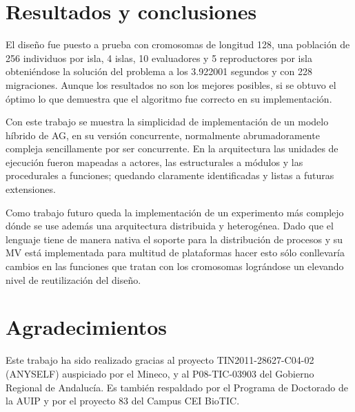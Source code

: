 \documentclass[runningheads]{llncs}
\begin{document}
\section{Resultados y conclusiones}
\label{sec:conclusions}

El diseño fue puesto a prueba con cromosomas de longitud 128, una población de 256 individuos por isla, 4 islas, 10 evaluadores y 5 reproductores por isla obteniéndose la solución del problema a los 3.922001 segundos y con 228 migraciones. Aunque los resultados no son los mejores posibles, si se obtuvo el óptimo lo que demuestra que el algoritmo fue correcto en su implementación.

Con este trabajo se muestra la simplicidad de implementación de un modelo híbrido de AG, en su versión concurrente, normalmente abrumadoramente compleja sencillamente por ser concurrente. En la arquitectura las unidades de ejecución fueron mapeadas a actores, las estructurales a módulos y las procedurales a funciones; quedando claramente identificadas y listas a futuras extensiones.

Como trabajo futuro queda la implementación de un experimento más complejo dónde se use además una arquitectura distribuida y heterogénea. Dado que el lenguaje tiene de manera nativa el soporte para la distribución de procesos y su MV está implementada para multitud de plataformas hacer esto sólo conllevaría cambios en las funciones que tratan con los cromosomas lográndose un elevando nivel de reutilización del diseño.

\section{Agradecimientos}

Este trabajo ha sido realizado gracias al proyecto TIN2011-28627-C04-02 (ANYSELF) auspiciado por el Mineco, y al P08-TIC-03903 del Gobierno Regional de Andalucía. Es también respaldado por el Programa de Doctorado de la AUIP y por el proyecto 83 del Campus CEI BioTIC.



\end{document}
